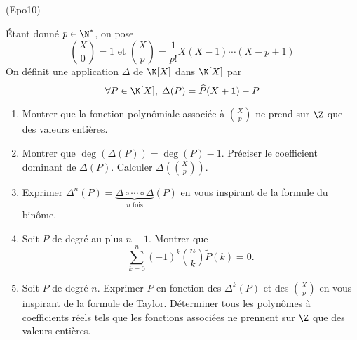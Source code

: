 \begin{tiny}(Epo10)\end{tiny} \'Etant donn{\'e} $p \in \N^*$, on pose
\begin{displaymath}
\binom{X}{0}=1
\text{ et }
\binom{X}{p}=\frac{1}{p!}X(X-1)\cdots (X-p+1) 
\end{displaymath}
On définit une application $\Delta$ de $\K[X]$ dans  $\K[X]$ par
\begin{displaymath}
\forall P \in \K[X],\; \Delta(P) = \widehat{P}(X+1) - P
\end{displaymath}
\begin{enumerate}
\item Montrer que la fonction polyn{\^o}miale associ{\'e}e {\`a} $\binom{X}{p}$ ne prend sur $\Z$ que des valeurs enti{\`e}res.

\item  Montrer que $\deg(\Delta(P))=\deg(P)-1$. Préciser le coefficient dominant de $\Delta(P)$. Calculer $\Delta (\binom{X}{p})$.

\item Exprimer $\Delta^n(P) = \underset{ n \text{ fois}}{\underbrace{\Delta \circ \cdots \circ \Delta}} (P)$ en vous inspirant de la formule du binôme.

\item Soit $P$ de degré au plus $n-1$. Montrer que
\begin{displaymath}
 \sum_{k=0}^n(-1)^k\binom{n}{k}\widetilde{P}(k) = 0 .
\end{displaymath}

\item Soit $P$ de degré $n$. Exprimer $P$ en fonction des $\Delta^k(P)$ et des $\binom{X}{p}$ en vous inspirant de la formule de Taylor.\newline 
D{\'e}terminer tous les polyn{\^o}mes {\`a} coefficients r{\'e}els tels que les fonctions associ{\'e}es ne prennent sur
$\Z$ que des valeurs enti{\`e}res.
\end{enumerate}
